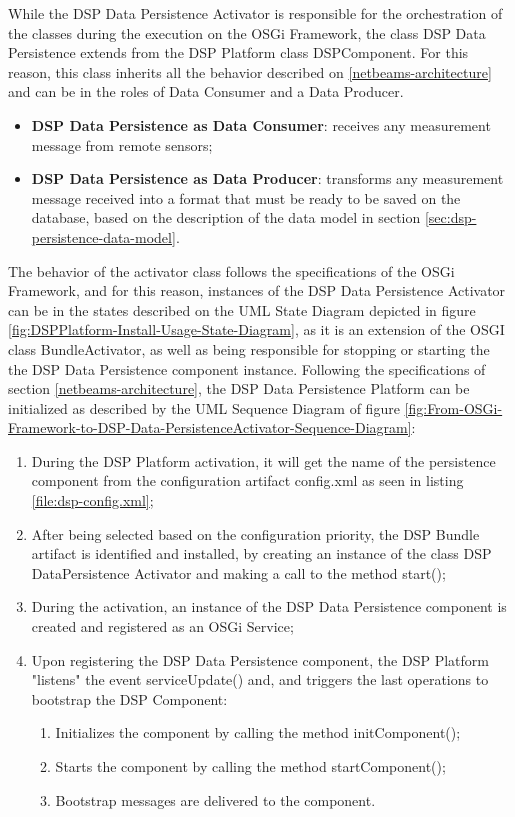 While the DSP Data Persistence Activator is responsible for the orchestration
of the classes during the execution on the OSGi Framework, the class DSP Data
Persistence extends from the DSP Platform class DSPComponent. For this reason,
this class inherits all the behavior described on \ref{netbeams-architecture}
and can be in the roles of Data Consumer and a Data Producer.

\begin{itemize}
  \item \textbf{DSP Data Persistence as Data Consumer}: receives any measurement
  message from remote sensors;
  \item \textbf{DSP Data Persistence as Data Producer}: transforms any
  measurement message received into a format that must be ready to be saved on the
  database, based on the description of the data model in section
  \ref{sec:dsp-persistence-data-model}.
\end{itemize}

The behavior of the activator class follows the specifications of the
OSGi Framework, and for this reason, instances of the DSP Data Persistence
Activator can be in the states described on the UML State Diagram depicted in
figure \ref{fig:DSPPlatform-Install-Usage-State-Diagram}, as it is an extension
of the OSGI class BundleActivator, as well as being responsible for stopping
or starting the the DSP Data Persistence component instance. Following the
specifications of section \ref{netbeams-architecture}, the DSP Data Persistence
Platform can be initialized as described by the UML Sequence Diagram of figure
\ref{fig:From-OSGi-Framework-to-DSP-Data-PersistenceActivator-Sequence-Diagram}:

\begin{enumerate}
  \item During the DSP Platform activation, it will get the name of the
  persistence component from the configuration artifact config.xml as seen in
  listing \ref{file:dsp-config.xml};
  \item After being selected based on the configuration priority, the DSP
  Bundle artifact is identified and installed, by creating an instance of the
  class DSP DataPersistence Activator and making a call to the method start();
  \item During the activation, an instance of the DSP Data Persistence
  component is created and registered as an OSGi Service;
  \item Upon registering the DSP Data Persistence component, the DSP Platform
  "listens" the event serviceUpdate() and, and triggers the last operations to
  bootstrap the DSP Component:
   \begin{enumerate}
      \item Initializes the component by calling the method initComponent();
      \item Starts the component by calling the method startComponent();
      \item Bootstrap messages are delivered to the component.
   \end{enumerate}
\end{enumerate}

